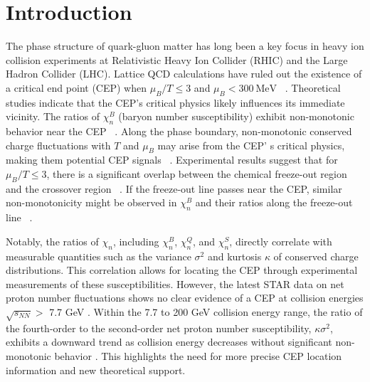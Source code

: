 \documentclass[a4paper,12pt]{article}
\numberwithin{equation}{section}
\begin{document}
\section{Introduction}\label{sec:01}

The phase structure of quark-gluon matter has long been a key focus in heavy ion collision experiments at Relativistic Heavy Ion Collider (RHIC) and the Large Hadron Collider (LHC). Lattice QCD calculations have ruled out the existence of a critical end point (CEP) when $\mu_B/T \leq 3$ and $\mu_B < 300~\text{MeV}$ ~\cite{Vovchenko:2017gkg,Borsanyi:2020fev,Bazavov:2020bjn,Borsanyi:2021sxv,Bollweg:2022fqq,Philipsen:2021qji}. Theoretical studies indicate that the CEP's critical physics likely influences its immediate vicinity. The ratios of $\chi_n^B$ (baryon number susceptibility) exhibit non-monotonic behavior near the CEP ~\cite{Asakawa:2009aj,Schaefer:2011ex,Fan:2016ovc,Portillo:2016fso,Fan:2017mrk,Li:2017ple,Li:2018ygx,Fu:2021oaw,Zhao:2023xpj,Li:2023mpv}. Along the phase boundary, non-monotonic conserved charge fluctuations with $T$ and $\mu_B$ may arise from the CEP' s critical physics, making them potential CEP signals ~\cite{Stephanov:2011pb}. Experimental results suggest that for $\mu_B/T \leq 3$, there is a significant overlap between the chemical freeze-out region and the crossover region ~\cite{STAR:2017sal}. If the freeze-out line passes near the CEP, similar non-monotonicity might be observed in $\chi_n^B$ and their ratios along the freeze-out line ~\cite{Fan:2016ovc,Fan:2017mrk,Li:2017ple,Portillo:2017gfk,Li:2018ygx,Wang:2018sur,Fu:2021oaw,Zhao:2023xpj,Huang:2023ogw}.

Notably, the ratios of $\chi_n$, including $\chi_n^B$, $\chi_n^Q$, and $\chi_n^S$, directly correlate with measurable quantities such as the variance $\sigma^2$ and kurtosis $\kappa$ of conserved charge distributions. This correlation allows for locating the CEP through experimental measurements of these susceptibilities. However, the latest STAR data on net proton number fluctuations shows no clear evidence of a CEP at collision energies $\sqrt{s_{NN}} >$ 7.7 GeV \cite{STAR:2025zdq}. Within the 7.7 to 200 GeV collision energy range, the ratio of the fourth-order to the second-order net proton number susceptibility, $\kappa\sigma^2$, exhibits a downward trend as collision energy decreases without significant non-monotonic behavior \cite{STAR:2025zdq}. This highlights the need for more precise CEP location information and new theoretical support.
\end{document}
